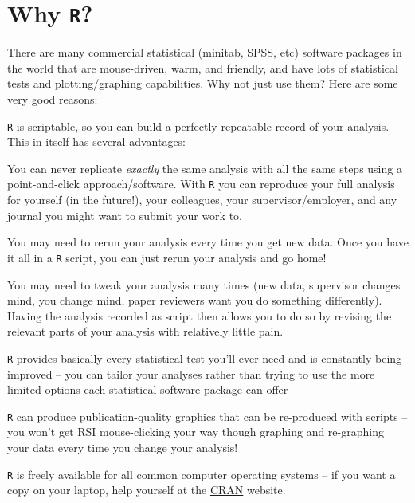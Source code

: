 \section{Why {\tt R}?} 
There are many commercial statistical (minitab, SPSS, etc) software 
packages in the world that are mouse-driven, warm, and friendly, and 
have lots of statistical tests and plotting/graphing capabilities. Why 
not just use them? Here are some very good reasons:
\begin{compactitem}\itemsep4pt
	\item {\tt R} is scriptable, so you can build a perfectly repeatable 
	record of your analysis. This in itself has several advantages:
		\begin{compactitem}\itemsep0pt
			\item You can never replicate {\it exactly} the same analysis with 
			all the same steps using a point-and-click approach/software. 
			With {\tt R} you can reproduce your full analysis for 
			 yourself (in the future!), your colleagues, your 
			 supervisor/employer, and any journal you might want to submit your work to.
			\item You may need to rerun your analysis every time you get new data. 
			Once you have it all in a {\tt R} script, you can just rerun your 
			analysis and go home!
			\item You may need to tweak your analysis many times (new data, 
			supervisor changes mind, you change mind, paper reviewers want 
			you do something differently). Having the analysis recorded as 
			script then allows you to do so by revising the relevant parts of your 
			analysis with relatively little pain.  
		\end{compactitem}
			
	\item {\tt R} provides basically every statistical test you'll ever need 
	and is constantly being improved --  you can tailor your analyses 
	rather than trying to use the more limited options each 
	statistical software package can offer 
	 
	\item {\tt R} can produce publication-quality graphics that can be 
	re-produced with scripts -- you won't get RSI mouse-clicking your 
	way though graphing and re-graphing your data every time you change 
	your analysis!
	  
	\item {\tt R} is freely available for all common computer operating systems 
	-- if you want a copy on your laptop, help yourself 
	at the \href{https://cran.r-project.org}{CRAN} website.

\end{compactitem}

